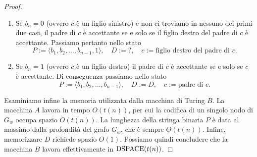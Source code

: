 \begin{proof}
\begin{itemize}
\begin{enumerate}
    \item Se $b_n=0$ (ovvero $c$ è un figlio sinistro) e non ci troviamo in nessuno dei primi due casi,
    il padre di $c$ è accettante se e solo se il figlio destro del padre di $c$ è accettante.
    Passiamo pertanto nello stato
    \[ P := \langle b_1, b_2, \ldots, b_{n-1}, 1 \rangle, \quad D := \texttt{?}, \quad c := \text{figlio destro del padre di $c$}. \]
    
    \item Se $b_n=1$ (ovvero $c$ è un figlio destro) il padre di $c$ è accettante se e solo se $c$ è accettante.
    Di conseguenza passiamo nello stato
    \[ P := \langle b_1, b_2, \ldots, b_{n-1} \rangle, \quad D := D, \quad c := \text{padre di $c$}. \]
  \end{enumerate}
 \end{itemize}

 Esaminiamo infine la memoria utilizzata dalla macchina di Turing $B$.
 La macchina $A$ lavora in tempo $O(t(n))$, per cui la codifica di un singolo nodo di $G_w$ occupa spazio $O(t(n))$.
 La lunghezza della stringa binaria $P$ è data al massimo dalla profondità del grafo $G_w$, che è sempre $O(t(n))$.
 Infine, memorizzare $D$ richiede spazio $O(1)$.
 Possiamo quindi concludere che la macchina $B$ lavora effettivamente in $\operatorname{DSPACE}(t(n))$.
 
\end{proof}

